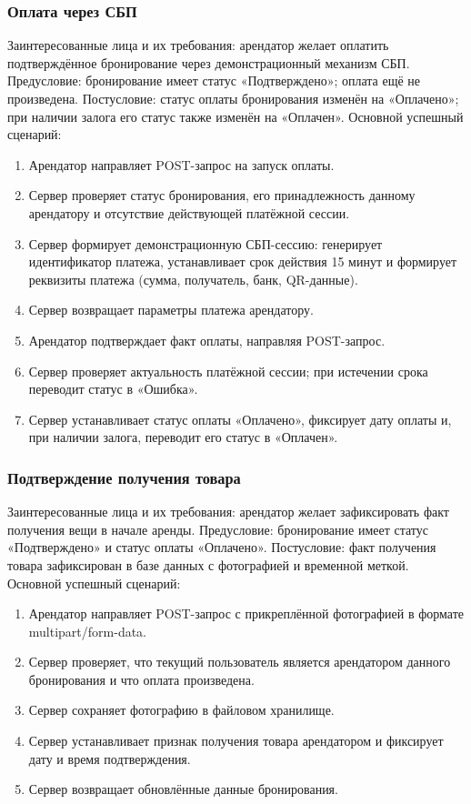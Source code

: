 \subsubsection{Оплата через СБП}
Заинтересованные лица и их требования: арендатор желает оплатить подтверждённое бронирование через демонстрационный механизм СБП.
Предусловие: бронирование имеет статус «Подтверждено»; оплата ещё не произведена.
Постусловие: статус оплаты бронирования изменён на «Оплачено»; при наличии залога его статус также изменён на «Оплачен».
Основной успешный сценарий:
\begin{enumerate}
\item Арендатор направляет POST-запрос на запуск оплаты.
\item Сервер проверяет статус бронирования, его принадлежность данному арендатору и отсутствие действующей платёжной сессии.
\item Сервер формирует демонстрационную СБП-сессию: генерирует идентификатор платежа, устанавливает срок действия 15 минут и формирует реквизиты платежа (сумма, получатель, банк, QR-данные).
\item Сервер возвращает параметры платежа арендатору.
\item Арендатор подтверждает факт оплаты, направляя POST-запрос.
\item Сервер проверяет актуальность платёжной сессии; при истечении срока переводит статус в «Ошибка».
\item Сервер устанавливает статус оплаты «Оплачено», фиксирует дату оплаты и, при наличии залога, переводит его статус в «Оплачен».
\end{enumerate}

\subsubsection{Подтверждение получения товара}
Заинтересованные лица и их требования: арендатор желает зафиксировать факт получения вещи в начале аренды.
Предусловие: бронирование имеет статус «Подтверждено» и статус оплаты «Оплачено».
Постусловие: факт получения товара зафиксирован в базе данных с фотографией и временной меткой.
Основной успешный сценарий:
\begin{enumerate}
\item Арендатор направляет POST-запрос с прикреплённой фотографией в формате multipart/form-data.
\item Сервер проверяет, что текущий пользователь является арендатором данного бронирования и что оплата произведена.
\item Сервер сохраняет фотографию в файловом хранилище.
\item Сервер устанавливает признак получения товара арендатором и фиксирует дату и время подтверждения.
\item Сервер возвращает обновлённые данные бронирования.
\end{enumerate}

